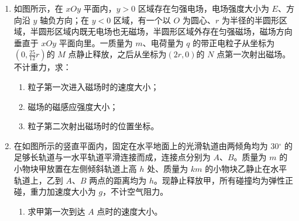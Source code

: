\begin{enumerate}
\item
如图所示，在 $ xOy $ 平面内，$ y >0 $ 区域存在匀强电场，电场强度大小为 $ E $、方向沿 $ y $ 轴负方向；在 $ y <0 $ 区域，有一个以 $ O $ 为圆心、$ r $ 为半径的半圆形区域，半圆形区域内既无电场也无磁场，半圆形区域外存在匀强磁场，磁场方向垂直于 $ xOy $ 平面向里。一质量为 $ m $、电荷量为 $ q $ 的带正电粒子从坐标为$( 0 , \frac{{25}}{{12}}r )$的 $ M $ 点静止释放，之后从坐标为$( 2r,0 )$的 $ N $ 点第一次射出磁场。不计重力，求：
\begin{enumerate}
	\item 
	粒子第一次进入磁场时的速度大小；
	
	\item
	磁场的磁感应强度大小；
	
	\item
	粒子第二次射出磁场时的位置坐标。
\end{enumerate}
\begin{figure}[htbp]
	\raggedleft
	
\end{figure}


\item
在如图所示的竖直平面内，固定在水平地面上的光滑轨道由两倾角均为 $ 30 {^\circ} $ 的足够长轨道与一水平轨道平滑连接而成，连接点分别为 $ A $、$ B $。质量为 $ m $ 的小物块甲放置在左侧倾斜轨道上高 $ h $ 处、质量为 $ km $ 的小物块乙静止在水平轨道上，乙到 $ A $、$ B $ 两点的距离均为 $ h $。现静止释放甲，所有碰撞均为弹性正碰，重力加速度大小为 $ g $，不计空气阻力。
\begin{enumerate}
	\item 
	求甲第一次到达 $ A $ 点时的速度大小。
	

\end{enumerate}
\end{enumerate}
